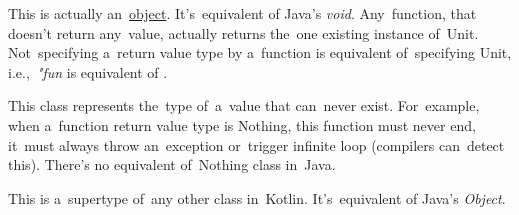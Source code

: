 
\label{kotlinunit}
This is actually an~\hyperref[kotlinobject]{object}.
It's~equivalent of Java's \textit{void}.
Any~function, that doesn't return any~value, actually returns the~one existing instance of~Unit.
Not~specifying a~return value type by a~function is equivalent of~specifying Unit, \mbox{i.e., \textit{"fun}}  is equivalent of .

\label{kotlinnothing}
This class represents the~type of~a~value that can~never exist.
For~example, when a~function return value type is Nothing, this function must never end, it~must always throw an~exception or~trigger infinite loop (compilers can~detect this).
There's no equivalent of~Nothing class in~Java.

This is a~supertype of~any other class in~Kotlin.
It's~equivalent of Java's \textit{Object}.

